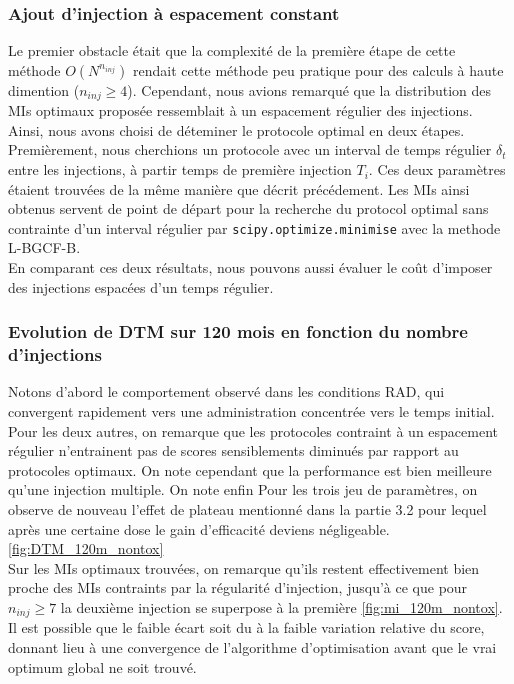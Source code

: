 \documentclass[12pt,a4paper]{article}
\begin{document}
\subsubsection{Ajout d'injection à espacement constant}
Le premier obstacle était que la complexité de la première étape de cette méthode $O({N}^{n_{inj}})$ rendait cette méthode peu pratique pour des calculs à haute dimention ($n_{inj}\geq4$). Cependant, nous avions remarqué que la distribution des \acp{MI} optimaux proposée ressemblait à un espacement régulier des injections. Ainsi, nous avons choisi de déteminer le protocole optimal en deux étapes. Premièrement, nous cherchions un protocole avec un interval de temps régulier $\delta_{t}$ entre les injections, à partir temps de première injection $T_{i}$. Ces deux paramètres étaient trouvées de la même manière que décrit précédement. Les \acp{MI} ainsi obtenus servent de point de départ pour la recherche du protocol optimal sans contrainte d'un interval régulier par \texttt{scipy.optimize.minimise} avec la methode L-BGCF-B\cite{}.\\
En comparant ces deux résultats, nous pouvons aussi évaluer le coût d'imposer des injections espacées d'un temps régulier.

\subsubsection[TODO Injections multiples 120 mois]{Evolution de \acf{DTM} sur 120 mois en fonction du nombre d'injections}
Notons d'abord le comportement observé dans les conditions RAD, qui convergent rapidement vers une administration concentrée vers le temps initial. Pour les deux autres, on remarque que les protocoles contraint à un espacement régulier n'entrainent pas de scores sensiblements diminués par rapport au protocoles optimaux. On note cependant que la performance est bien meilleure qu'une injection multiple. On note enfin 
Pour les trois jeu de paramètres, on observe de nouveau l'effet de plateau mentionné dans la partie 3.2 pour lequel après une certaine dose le gain d'efficacité deviens négligeable. \ref{fig:DTM_120m_nontox}\\
Sur les \acp{MI} optimaux trouvées, on remarque qu'ils restent effectivement bien proche des \acp{MI} contraints par la régularité d'injection, jusqu'à ce que pour $n_{inj} \geqslant 7$ la deuxième injection se superpose à la première \ref{fig:mi_120m_nontox}. Il est possible que le faible écart soit du à la faible variation relative du score, donnant lieu à une convergence de l'algorithme d'optimisation avant que le vrai optimum global ne soit trouvé.
\end{document}
